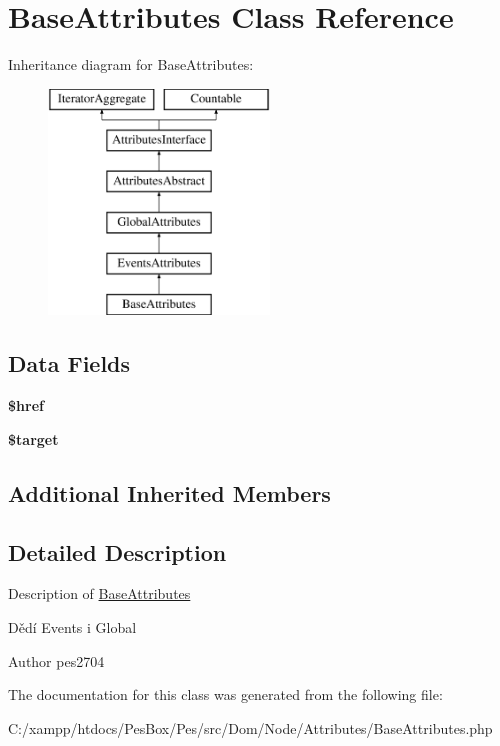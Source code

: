 \hypertarget{class_pes_1_1_dom_1_1_node_1_1_attributes_1_1_base_attributes}{}\section{Base\+Attributes Class Reference}
\label{class_pes_1_1_dom_1_1_node_1_1_attributes_1_1_base_attributes}
Inheritance diagram for Base\+Attributes\+:\begin{figure}[H]
\begin{center}
\leavevmode
\includegraphics[height=6.000000cm]{class_pes_1_1_dom_1_1_node_1_1_attributes_1_1_base_attributes}
\end{center}
\end{figure}
\subsection*{Data Fields}
\begin{DoxyCompactItemize}
\item 
\mbox{\label{class_pes_1_1_dom_1_1_node_1_1_attributes_1_1_base_attributes_ae858fe52917aca7da3e5f64ac5bf665a}} 
{\bfseries \$href}
\item 
\mbox{\label{class_pes_1_1_dom_1_1_node_1_1_attributes_1_1_base_attributes_a97f00a3eb3f2c3198313323c8df7dcb2}} 
{\bfseries \$target}
\end{DoxyCompactItemize}
\subsection*{Additional Inherited Members}


\subsection{Detailed Description}
Description of \mbox{\hyperlink{class_pes_1_1_dom_1_1_node_1_1_attributes_1_1_base_attributes}{Base\+Attributes}}

Dědí Events i Global

\begin{DoxyAuthor}{Author}
pes2704 
\end{DoxyAuthor}


The documentation for this class was generated from the following file\+:\begin{DoxyCompactItemize}
\item 
C\+:/xampp/htdocs/\+Pes\+Box/\+Pes/src/\+Dom/\+Node/\+Attributes/Base\+Attributes.\+php\end{DoxyCompactItemize}
